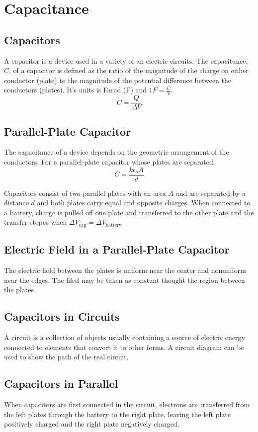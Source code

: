\section{Capacitance}
\subsection{Capacitors}
A capacitor is a device used in a variety of an electric circuits. The capacitance, $C$, of a capacitor is defined as the ratio of the magnitude of the charge on either conductor (plate) to the magnitude of the potential difference between the conductors (plates). It's units is Farad (F) and $1F=\frac{C}{V}$.
\[C=\frac{Q}{\Delta V}\]

\subsection{Parallel-Plate Capacitor}
The capacitance of a device depends on the geometric arrangement of the conductors. For a parallel-plate capacitor whose plates are separated:
\[C=\frac{k\epsilon_o A}{d}\]

Capacitors consist of two parallel plates with an area $A$ and are separated by a distance $d$ and both plates carry equal and opposite charges. When connected to a battery, charge is pulled off one plate and transferred to the other plate and the transfer stopes when $\Delta V_{\text{cap}}=\Delta V_{\text{battery}}$

\subsection{Electric Field in a Parallel-Plate Capacitor}
The electric field between the plates is uniform near the center and nonuniform near the edges. The filed may be taken as constant thought the region between the plates.

\subsection{Capacitors in Circuits}
A circuit is a collection of objects usually containing a source of electric energy connected to elements that convert it to other forms. A circuit diagram can be used to show the path of the real circuit. 

\subsection{Capacitors in Parallel}
When capacitors are first connected in the circuit, electrons are transferred from the left plates through the battery to the right plate, leaving the left plate positively charged and the right plate negatively charged.

